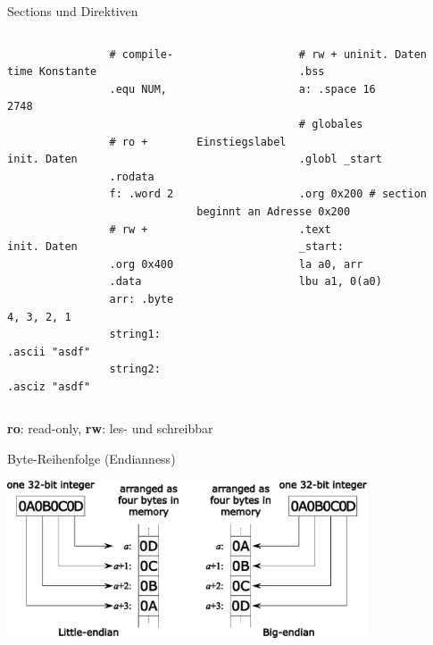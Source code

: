 \documentclass[
  german,            %
  aspectratio=169,    %
]{tumbeamer}
\begin{document}
\begin{frame}[c, fragile]{Sections und Direktiven}
	\begin{columns}[c]
		\begin{column}{0.49\textwidth}
			\begin{verbatim}
				# compile-time Konstante
				.equ NUM, 2748 
				
				# ro + init. Daten
				.rodata
				f: .word 2
				
				# rw + init. Daten
				.org 0x400
				.data
				arr: .byte 4, 3, 2, 1
				string1: .ascii "asdf"
				string2: .asciz "asdf"
			\end{verbatim}
		\end{column}
		\begin{column}{0.49\textwidth}
			\begin{verbatim}
				# rw + uninit. Daten
				.bss
				a: .space 16
				
				# globales Einstiegslabel
				.globl _start
				
				.org 0x200 # section beginnt an Adresse 0x200
				.text
				_start:
				la a0, arr
				lbu a1, 0(a0)
			\end{verbatim}
		\end{column}
	\end{columns}
	\begin{center}
		\small{\textbf{ro}: read-only, \textbf{rw}: les- und schreibbar}
	\end{center}
\end{frame}

\begin{frame}[c]{Byte-Reihenfolge (Endianness)}{}
	\begin{center}
		\includegraphics[width=0.8\textwidth]{w03_endianess.pdf}
	\end{center}
\end{frame}
\end{document}
